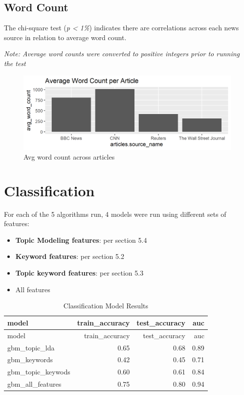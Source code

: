 \documentclass[
]{article}
\begin{document}
\hypertarget{word-count}{%
\subsection{Word Count}\label{word-count}}

The chi-square test (\emph{p \textless{} 1\%}) indicates there are
correlations across each news source in relation to average word count.

\emph{Note: Average word counts were converted to positive integers
prior to running the test}

\begin{figure}
\centering
\includegraphics{../figures/avg_word_count.png}
\caption{Avg word count across articles}
\end{figure}

\hypertarget{classification}{%
\section{Classification}\label{classification}}

For each of the 5 algorithms run, 4 models were run using different sets
of features:

\begin{itemize}
\item
  \textbf{Topic Modeling features}: per section 5.4
\item
  \textbf{Keyword features}: per section 5.2
\item
  \textbf{Topic keyword features}: per section 5.3
\item
  All features
\end{itemize}

\begin{longtable}[]{@{}lrrr@{}}
\caption{Classification Model Results}\tabularnewline
\toprule
model & train\_accuracy & test\_accuracy & auc\tabularnewline
\midrule
\endfirsthead
\toprule
model & train\_accuracy & test\_accuracy & auc\tabularnewline
\midrule
\endhead
gbm\_topic\_lda & 0.65 & 0.68 & 0.89\tabularnewline
gbm\_keywords & 0.42 & 0.45 & 0.71\tabularnewline
gbm\_topic\_keywods & 0.60 & 0.61 & 0.84\tabularnewline
gbm\_all\_features & 0.75 & 0.80 & 0.94\tabularnewline
\bottomrule
\end{longtable}
\end{document}
